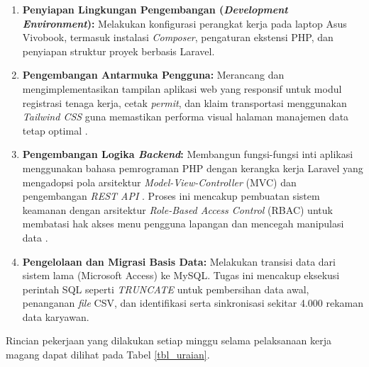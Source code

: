 \begin{enumerate}
    \item \textbf{Penyiapan Lingkungan Pengembangan (\textit{Development Environment}):} Melakukan konfigurasi perangkat kerja pada laptop Asus Vivobook, termasuk instalasi \textit{Composer}, pengaturan ekstensi PHP, dan penyiapan struktur proyek berbasis Laravel.
    \item \textbf{Pengembangan Antarmuka Pengguna:} Merancang dan mengimplementasikan tampilan aplikasi web yang responsif untuk modul registrasi tenaga kerja, cetak \textit{permit}, dan klaim transportasi menggunakan \textit{Tailwind CSS} guna memastikan performa visual halaman manajemen data tetap optimal \cite{nandan2024tailwind}.
    \item \textbf{Pengembangan Logika \textit{Backend}:} Membangun fungsi-fungsi inti aplikasi menggunakan bahasa pemrograman PHP dengan kerangka kerja Laravel yang mengadopsi pola arsitektur \textit{Model-View-Controller} (MVC) \cite{rahmawati2024mvc} dan pengembangan \textit{REST API} \cite{ariyanto2024restapi}. Proses ini mencakup pembuatan sistem keamanan dengan arsitektur \textit{Role-Based Access Control} (RBAC) untuk membatasi hak akses menu pengguna lapangan dan mencegah manipulasi data \cite{mary2025rbac}.
    \item \textbf{Pengelolaan dan Migrasi Basis Data:} Melakukan transisi data dari sistem lama (Microsoft Access) ke MySQL. Tugas ini mencakup eksekusi perintah SQL seperti \textit{TRUNCATE} untuk pembersihan data awal, penanganan \textit{file} CSV, dan identifikasi serta sinkronisasi sekitar 4.000 rekaman data karyawan.
\end{enumerate}

Rincian pekerjaan yang dilakukan setiap minggu selama pelaksanaan kerja magang dapat dilihat pada Tabel \ref{tbl_uraian}.

